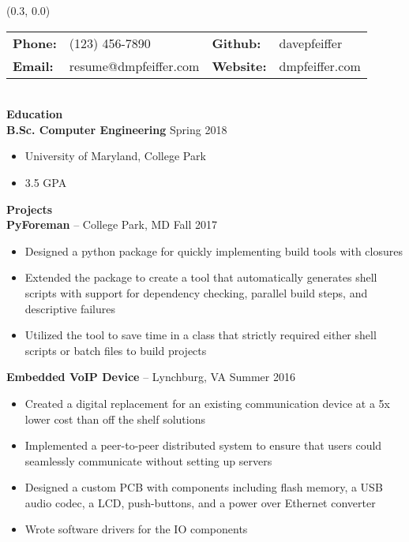 \documentclass[10pt]{article}
\begin{document}
  \begin{textblock}{0.7}(0.3, 0.0)

    \begin{tabular}{ l l l l }
      \bfseries Phone: & (123) 456-7890 & 
      \bfseries Github: & davepfeiffer \\
      \bfseries Email: & resume@dmpfeiffer.com & 
      \bfseries Website: & dmpfeiffer.com \\
    \end{tabular} \\

    \textbf{\large Education } \\
      \textbf{B.Sc. Computer Engineering} \hfill Spring 2018
      \begin{itemize}
        \setlength{\itemsep}{0pt}
        \item University of Maryland, College Park
        \item 3.5 GPA
      \end{itemize}
    \textbf{\large Projects} \\
      \textbf{PyForeman} -- College Park, MD \hfill Fall 2017
      \begin{itemize}
        \item Designed a python package for quickly implementing build tools with closures
        \item Extended the package to create a tool that automatically generates shell scripts with support for dependency checking, parallel build steps, and descriptive failures
        \item Utilized the tool to save time in a class that strictly required either shell scripts or batch files to build projects
      \end{itemize}
      \textbf{Embedded VoIP Device} -- Lynchburg, VA \hfill Summer 2016
      \begin{itemize}
        \setlength{\itemsep}{0pt}
        \item Created a digital replacement for an existing communication device at a 5x lower cost than off the shelf solutions
        \item Implemented a peer-to-peer distributed system to ensure that users could seamlessly communicate without setting up servers
        \item Designed a custom PCB with components including flash memory, a USB audio codec, a LCD, push-buttons, and a power over Ethernet converter
        \item Wrote software drivers for the IO components

\end{itemize}
\end{textblock}
\end{document}
